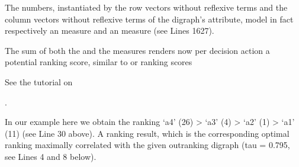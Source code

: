 \documentclass[a4paper,12pt,english]{sphinxhowto}
\begin{document}
\sphinxAtStartPar
The  numbers, instantiated by the row vectors without reflexive terms  and the column vectors without reflexive terms of the digraph’s  attribute, model in fact respectively an  measure  and an  measure  (see Lines 16\sphinxhyphen{}27).

\sphinxAtStartPar
The sum  of both the  and the  measures renders now per decision action  a potential ranking score, similar to  or  ranking scores %
\begin{footnote}[21]\sphinxAtStartFootnote
See the tutorial on 
%
\end{footnote}.

\sphinxAtStartPar
In our example here we obtain the  ranking ‘a4’ (26) \textgreater{} ‘a3’ (4) \textgreater{} ‘a2’ (1) \textgreater{} ‘a1’ (\sphinxhyphen{}11) (see Line 30 above). A ranking result, which is the corresponding optimal  ranking maximally correlated with the given outranking digraph (tau = 0.795, see Lines 4 and 8 below).

%
\begin{sphinxVerbatim}[commandchars=\\\{\},numbers=left,firstnumber=1,stepnumber=1]
   
  
  \PYG{p}{[}\PYG{p}{]}
\end{sphinxVerbatim}
\sphinxresetverbatimhllines
\end{document}
